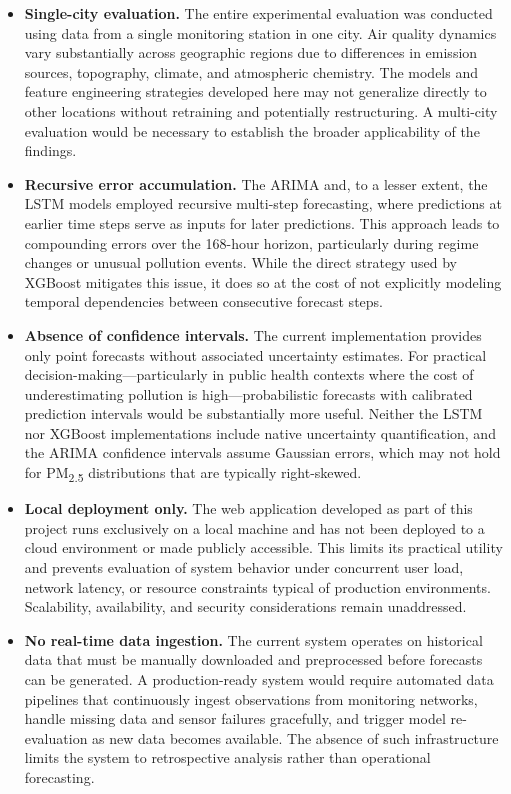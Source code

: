 \begin{itemize}
    \item \textbf{Single-city evaluation.} The entire experimental evaluation was conducted using data from a single monitoring station in one city. Air quality dynamics vary substantially across geographic regions due to differences in emission sources, topography, climate, and atmospheric chemistry. The models and feature engineering strategies developed here may not generalize directly to other locations without retraining and potentially restructuring. A multi-city evaluation would be necessary to establish the broader applicability of the findings.

    \item \textbf{Recursive error accumulation.} The ARIMA and, to a lesser extent, the LSTM models employed recursive multi-step forecasting, where predictions at earlier time steps serve as inputs for later predictions. This approach leads to compounding errors over the 168-hour horizon, particularly during regime changes or unusual pollution events. While the direct strategy used by XGBoost mitigates this issue, it does so at the cost of not explicitly modeling temporal dependencies between consecutive forecast steps.

    \item \textbf{Absence of confidence intervals.} The current implementation provides only point forecasts without associated uncertainty estimates. For practical decision-making---particularly in public health contexts where the cost of underestimating pollution is high---probabilistic forecasts with calibrated prediction intervals would be substantially more useful. Neither the LSTM nor XGBoost implementations include native uncertainty quantification, and the ARIMA confidence intervals assume Gaussian errors, which may not hold for PM\textsubscript{2.5} distributions that are typically right-skewed.

    \item \textbf{Local deployment only.} The web application developed as part of this project runs exclusively on a local machine and has not been deployed to a cloud environment or made publicly accessible. This limits its practical utility and prevents evaluation of system behavior under concurrent user load, network latency, or resource constraints typical of production environments. Scalability, availability, and security considerations remain unaddressed.

    \item \textbf{No real-time data ingestion.} The current system operates on historical data that must be manually downloaded and preprocessed before forecasts can be generated. A production-ready system would require automated data pipelines that continuously ingest observations from monitoring networks, handle missing data and sensor failures gracefully, and trigger model re-evaluation as new data becomes available. The absence of such infrastructure limits the system to retrospective analysis rather than operational forecasting.


\end{itemize}
